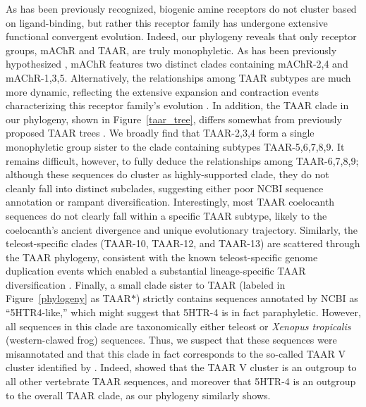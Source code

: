 \documentclass[fleqn,10pt]{wlpeerj}
\begin{document}
As has been previously recognized, biogenic amine receptors do not cluster based on ligand-binding, but rather this receptor family has undergone extensive functional convergent evolution. Indeed, our phylogeny reveals that only receptor groups, mAChR and TAAR, are truly monophyletic. As has been previously hypothesized \citep{Callieretal2003,KakaralaJamil2014}, mAChR features two distinct clades containing mAChR-2,4 and mAChR-1,3,5. Alternatively, the relationships among TAAR subtypes are much more dynamic, reflecting the extensive expansion and contraction events characterizing this receptor family's evolution \citep{Lindemann2005,Hashiguchi2007,Staubert2010,Staubert2013}. In addition, the TAAR clade in our phylogeny, shown in Figure~\ref{taar_tree}, differs somewhat from previously proposed TAAR trees \citep{Lindemann2005, Hashiguchi2007}. We broadly find that TAAR-2,3,4 form a single monophyletic group sister to the clade containing subtypes TAAR-5,6,7,8,9. It remains difficult, however, to fully deduce the relationships among TAAR-6,7,8,9; although these sequences do cluster as highly-supported clade, they do not cleanly fall into distinct subclades, suggesting either poor NCBI sequence annotation or rampant diversification. Interestingly, most TAAR coelocanth sequences do not clearly fall within a specific TAAR subtype, likely to the coelocanth's ancient divergence and unique evolutionary trajectory. Similarly, the teleost-specific clades (TAAR-10, TAAR-12, and TAAR-13) are scattered through the TAAR phylogeny, consistent with the known teleost-specific genome duplication events which enabled a substantial lineage-specific TAAR diversification \citep{Gloriametal2005}. Finally, a small clade sister to TAAR (labeled in Figure~\ref{phylogeny} as TAAR$\ast$) strictly contains sequences annotated by NCBI as ``5HTR4-like,'' which might suggest that 5HTR-4 is in fact paraphyletic. However, all sequences in this clade are taxonomically either teleost or \emph{Xenopus tropicalis} (western-clawed frog) sequences. Thus, we suspect that these sequences were misannotated and that this clade in fact corresponds to the so-called TAAR V cluster identified by \cite{Hashiguchi2007}. Indeed, \cite{Hashiguchi2007} showed that the TAAR V cluster is an outgroup to all other vertebrate TAAR sequences, and moreover that 5HTR-4 is an outgroup to the overall TAAR clade, as our phylogeny similarly shows.
\end{document}

